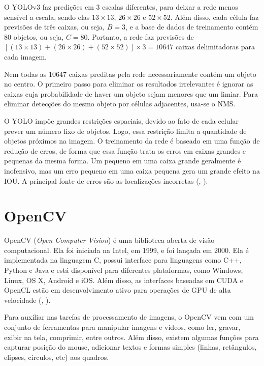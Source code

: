 \documentclass[]{politex}
\begin{document}
O YOLOv3 faz predições em 3 escalas diferentes, para deixar a rede menos sensível a escala, sendo elas \(13\times 13\), \(26 \times 26\) e \(52 \times 52\). Além disso, cada célula faz previsões de três caixas, ou seja, \(B=3\), e a base de dados de treinamento contém 80 objetos, ou seja, \(C=80\). Portanto, a rede faz previsões de \([(13 \times 13) + (26 \times 26)+(52 \times 52)] \times 3=10647\) caixas delimitadoras para cada imagem.

Nem todas as 10647 caixas preditas pela rede necessariamente contém um objeto no centro. O primeiro passo para eliminar os resultados irrelevantes é ignorar as caixas cuja probabilidade de haver um objeto sejam menores que um limiar. Para eliminar detecções do mesmo objeto por células adjacentes, usa-se o NMS.

O YOLO impõe grandes restrições espaciais, devido ao fato de cada celular prever um número fixo de objetos. Logo, essa restrição limita a quantidade de objetos próximos na imagem. O treinamento da rede é baseado em uma função de redução de erros, de forma que essa função trata os erros em caixas grandes e pequenas da mesma forma. Um pequeno em uma caixa grande geralmente é inofensivo, mas um erro pequeno em uma caixa pequena gera um grande efeito na IOU. A principal fonte de erros são as localizações incorretas (, \citeyear{yolov3}).


\section{OpenCV}
OpenCV (\textit{Open Computer Vision}) é uma biblioteca aberta de visão computacional. Ela foi iniciada na Intel, em 1999, e foi lançada em 2000. Ela é implementada na linguagem C, possui interface para linguagens como C++, Python e Java e está disponível para diferentes plataformas, como Windows, Linux, OS X, Android e iOS. Além disso, as interfaces baseadas em CUDA e OpenCL estão em desenvolvimento ativo para operações de GPU de alta velocidade (, \citeyear{opencvtutorials}).

Para auxiliar nas tarefas de processamento de imagens, o OpenCV vem com um conjunto de ferramentas para manipular imagens e vídeos, como ler, gravar, exibir na tela, comprimir, entre outros. Além disso, existem algumas funções para capturar posição do mouse, adicionar textos e formas simples (linhas, retângulos, elipses, círculos, etc) aos quadros.
\end{document}
